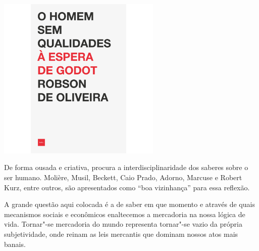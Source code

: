 \pagebreak


\begin{center}
\hspace*{.5cm}\includegraphics[width=78mm]{./grid/robson.png}
\end{center}

\hspace*{-7cm}\hrulefill\hspace*{-7cm}

\medskip

\noindent{}De forma ousada e criativa, {} procura a interdisciplinaridade dos saberes sobre o ser humano. Molière, Musil, Beckett, Caio Prado, Adorno, Marcuse e Robert Kurz, entre outros, são apresentados como “boa vizinhança” para essa reflexão. 

A grande questão aqui colocada é a de saber em que momento e através de quais mecanismos sociais e econômicos enaltecemos a mercadoria na nossa lógica de vida. Tornar"-se mercadoria do mundo representa tornar"-se vazio da própria subjetividade, onde reinam as leis mercantis que dominam nossos atos mais banais. 


\vfill

\hspace*{-.4cm}\begin{minipage}[c]{.5\linewidth}
\small{
{}}
\end{minipage}

